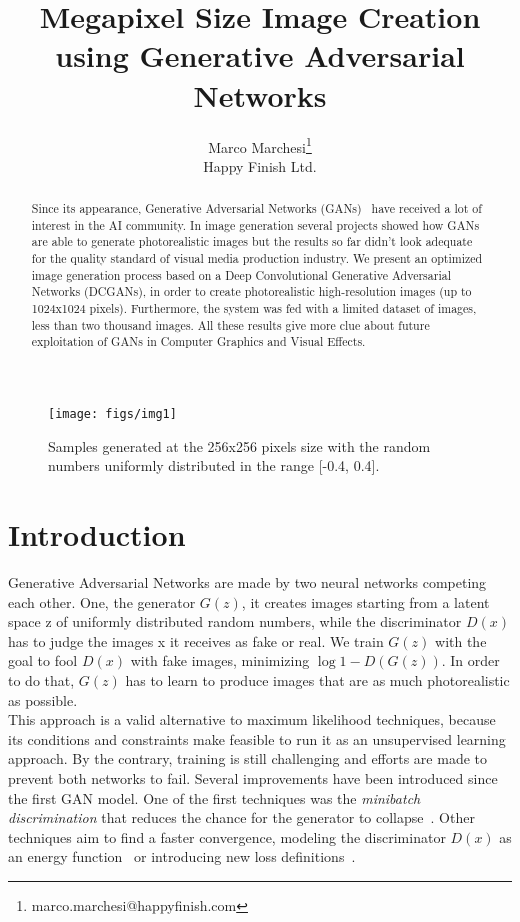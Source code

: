 \documentclass[10pt,twocolumn,letterpaper]{article}
\begin{document}
\title{Megapixel Size Image Creation using Generative Adversarial Networks}
\author{
Marco Marchesi\thanks{marco.marchesi@happyfinish.com}\\
Happy Finish Ltd.
}

\maketitle
\begin{figure*}
  \centering
  \texttt{[image: figs/img1]}
  \caption{Samples generated at the 256x256 pixels size with the random numbers uniformly distributed in the range [-0.4, 0.4].}
  \label{fig:teaser}
\end{figure*}
\begin{abstract}
Since its appearance, Generative Adversarial Networks (GANs)~\cite{2014arXiv1406.2661G} have received a lot of interest in the AI community. In image generation several projects showed how GANs are able to generate photorealistic images but the results so far didn't look adequate for the quality standard of visual media production industry. We present an optimized image generation process based on a Deep Convolutional Genera\-tive Adversarial Networks (DCGANs), in order to create photorealistic high-resolution images (up to 1024x1024 pixels). Furthermore, the system was fed with a limited dataset of images, less than two thousand images. All these results give more clue about future exploitation of GANs in Computer Graphics and Visual Effects.
\end{abstract}

\section{Introduction}
Generative Adversarial Networks are made by two neural networks competing each other. One, the gene\-rator $G(z)$, it creates images starting from a latent space z of uniformly distributed random numbers, while the discriminator $D(x)$ has to judge the ima\-ges x it receives as fake or real. We train $G(z)$ with the goal to fool $D(x)$ with fake images, minimizing $\log{1 - D(G(z))}$. In order to do that, $G(z)$ has to learn to produce images that are as much photorealistic as possible.\\
This approach is a valid alternative to maximum likelihood techniques, because its conditions and constraints make feasible to run it as an unsupervised learning approach. By the contrary, training is still challenging and efforts are made to prevent both networks to fail.
Several improvements have been introduced since the first GAN model. One of the first techniques was the \textit{minibatch discrimination} that reduces the chance for the generator to collapse~\cite{DBLP:conf/nips/SalimansGZCRCC16}. Other techniques aim to find a faster convergence, modeling the discriminator $D(x)$ as an energy function~\cite{DBLP:journals/corr/ZhaoML16} or introducing new loss definitions~\cite{2017arXiv170310717B}.
\end{document}
